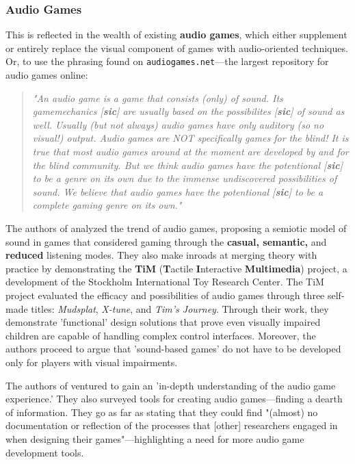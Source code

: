 \documentclass{report}
\newcommand{\tech}[1]{\textbf{#1}}
\begin{document}
\subsubsection{Audio Games}

This is reflected in the wealth of existing \tech{audio games}, which either supplement or entirely replace the visual component of games with audio-oriented techniques. Or, to use the phrasing found on \texttt{audiogames.net}---the largest repository for audio games online: 

\begin{quote}
\emph{"An audio game is a game that consists (only) of sound. Its gamemechanics [\tech{sic}] are usually based on the possibilites [\tech{sic}] of sound as well. Usually (but not always) audio games have only auditory (so no visual!) output. Audio games are NOT specifically games for the blind! It is true that most audio games around at the moment are developed by and for the blind community. But we think audio games have the potentional [\tech{sic}] to be a genre on its own due to the immense undiscovered possibilities of sound. We believe that audio games have the potentional [\tech{sic}] to be a complete gaming genre on its own."} \cite{Audiogames}    
\end{quote}




The authors of \cite{friberg2004audio} analyzed the trend of audio games, proposing a semiotic model of sound in games that considered gaming through the \tech{casual, semantic,} and \tech{reduced} listening modes. They also make inroads at merging theory with practice by demonstrating the \tech{TiM} (\tech{T}actile \tech{I}nteractive \tech{Multimedia}) project, a development of the Stockholm International Toy Research Center. The TiM project evaluated the efficacy and possibilities of audio games through three self-made titles: \emph{Mudsplat}, \emph{X-tune}, and \emph{Tim's Journey}. Through their work, they demonstrate 'functional' design solutions that prove even visually impaired children are capable of handling complex control interfaces. Moreover, the authors proceed to argue that 'sound-based games' do not have to be developed only for players with visual impairments. 


The authors of \cite{urbanek2019unpacking} ventured to gain an 'in-depth understanding of the audio game experience.' They also surveyed tools for creating audio games---finding a dearth of information. They go as far as stating that they could find "(almost) no documentation or reflection of the processes that [other] researchers engaged in when designing their games"---highlighting a need for more audio game development tools.
\end{document}
